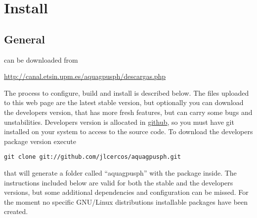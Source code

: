\chapter{Install \NAME}
\label{s:install}
%
\section{General}
%
\NAME can be downloaded from
%
\begin{center}
\url{http://canal.etsin.upm.es/aquagpusph/descargas.php}
\end{center}
%
The process to configure, build and install is described below. The files
uploaded to this web page are the latest stable version, but optionally
you can download the developers version, that has more fresh features, but
can carry some bugs and unstabilities. Developers version is allocated in
\href{https://github.com/}{github}, so you must have git installed on your
system to access to the source code. To download the developers package
version execute
%
\begin{verbatim}
git clone git://github.com/jlcercos/aquagpusph.git
\end{verbatim}
%
that will generate a folder called ``aquagpusph'' with the package inside.\rc
%
The instructions included below are valid for both the stable and the
developers versions, but some additional dependencies and configuration can
be missed.\rc
%
For the moment no specific GNU/Linux distributions installable packages have
been created.
%
